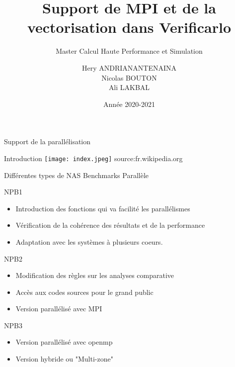 \documentclass{beamer}
\title[Support pour Verificarlo]{Support de MPI et de la vectorisation dans Verificarlo}
\subtitle{Master Calcul Haute Performance et Simulation}
\author[Hery, Nicolas, Ali]{Hery ANDRIANANTENAINA \\ Nicolas BOUTON \\ Ali LAKBAL}
\institute[]{\textbf{Encadrant:} Eric PETIT}
\date{Année 2020-2021}
\begin{document}
\maketitle

\begin{frame}{Support de la parallélisation}
    \begin{block}{Introduction}
      \texttt{[image: index.jpeg]}
      source:fr.wikipedia.org
    \end{block}

\end{frame}

\begin{frame}{Différentes types de NAS Benchmarks Parallèle}

    \begin{block}{NPB1}
      
        \begin{itemize}
            \item Introduction des fonctions qui va facilité les parallélismes
            \item Vérification de la cohérence des résultats et de la performance
            \item Adaptation avec les systèmes à plusieurs coeurs.
        \end{itemize}
    \end{block}
    
    \begin{block}{NPB2}
         \begin{itemize}
            \item Modification des règles sur les analyses comparative
            \item Accès aux codes sources pour le grand public
            \item Version parallélisé avec MPI
        \end{itemize}
    \end{block}
    
    \begin{block}{NPB3}
      \begin{itemize}
          \item Version parallélisé avec openmp
          \item Version hybride ou "Multi-zone" 
      \end{itemize}
    \end{block}

\end{frame}
 
\end{document}
